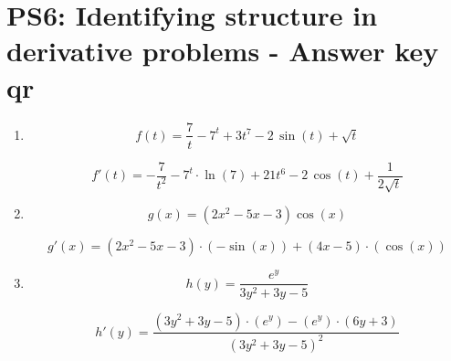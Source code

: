 

\usepackage{parskip,scalerel}

\newcommand{\diff}[1]{\frac{d}{d#1}}


\section{PS6: Identifying structure in derivative problems - Answer key qr}



\begin{enumerate}[leftmargin=15pt]
    \item \[f(t) = \frac{7}{t} - 7^t + 3t^7 - 2\, \sin(t)+ \sqrt{t}\]
    
    \[f'(t) = -\dfrac{7}{t^2} - 7^t \cdot \ln(7) + 21t^6 - 2\, \cos(t) + \dfrac{1}{2\sqrt{t}} \]

    \hrulefill
    \item \[g(x) = (2x^2 - 5x - 3) \cos(x)\]

    \[g'(x) = (2x^2 - 5x - 3)\cdot(-\sin(x)) + (4x - 5)\cdot(\cos(x))\]

    \hrulefill
    \item \[h(y) = \dfrac{e^y}{3y^2+3y-5} \]

    
    
    \[h'(y) = \dfrac{(3y^2+3y-5)\cdot(e^y) - (e^y)\cdot(6y+3)}{(3y^2+3y-5)^2}\]

\end{enumerate}


